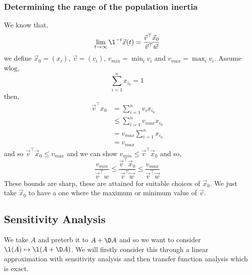 \subsubsection{Determining the range of the population inertia}
We know that,
$$ \lim_{t \to \infty} \l^{-t}\vec x(t) = \frac{\vec v^\top \vec x_0}{\vec v^\top \vec w} $$
we define $\vec x_0 = (x_i)$, $\vec v = (v_i)$, $v_{min} = \min_{i}v_i$ and $v_{max} = \max_i v_i$. Assume wlog,
$$ \sum_{i=1}^n x_{i_0} = 1 $$
then,
\begin{align*}
  \vec v^\top x_0 &= \sum_{i=1}^n v_ix_{i_0} \\
  &\le \sum_{i=1}^n v_{max}x_{i_0} \\
  &= v_{max}\sum_{i=1}^n x_{i_0}\\
  &= v_{max}
\end{align*}
and so $\vec v^\top \vec x_0 \le v_{max}$ and we can show $v_{min} \le \vec v^\top \vec x_0$ and so,
$$ \frac{v_{min}}{\vec v^\top w} \le \frac{\vec v^\top \vec x_0}{\vec v^\top \vec w} \le \frac{v_{max}}{\vec v^\top \vec w} $$
These bounds are sharp, these are attained for suitable choices of $\vec x_0$. We just take $\vec x_0$ to have a one where the maximum or minimum value of $\vec v$.

\subsection{Sensitivity Analysis}
We take $A$ and preterb it to $A + \D A$ and so we want to consider $\l(A) \mapsto \l(A + \D A)$. We will firstly consider this through a linear approximation with sensitivity analysis and then transfer function analysis which is exact.

